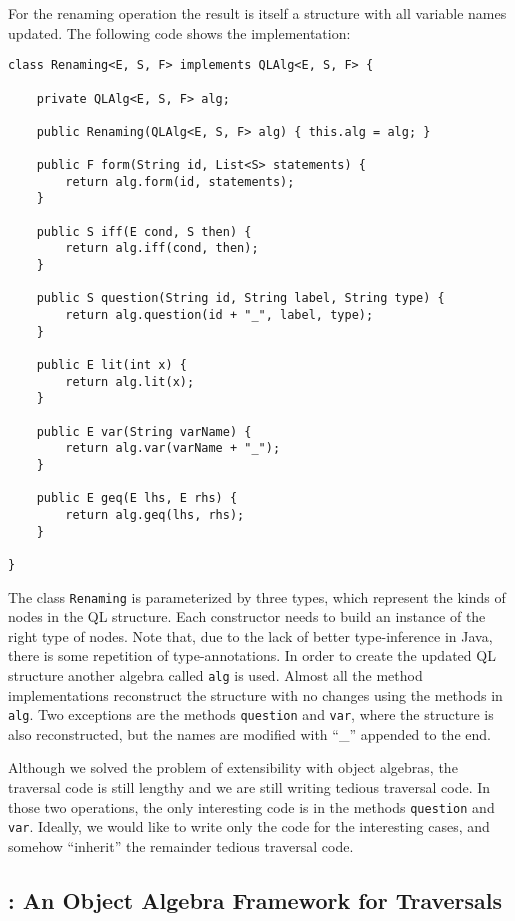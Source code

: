For the renaming operation the result is itself a structure
with all variable names updated. The following code shows the
implementation:

\begin{lstlisting}[numbers=none]
class Renaming<E, S, F> implements QLAlg<E, S, F> {

	private QLAlg<E, S, F> alg;
	
	public Renaming(QLAlg<E, S, F> alg) { this.alg = alg; }
	
	public F form(String id, List<S> statements) {
		return alg.form(id, statements);
	}

	public S iff(E cond, S then) {
		return alg.iff(cond, then);
	}

	public S question(String id, String label, String type) {
		return alg.question(id + "_", label, type);
	}

	public E lit(int x) {
		return alg.lit(x);
	}

	public E var(String varName) {
		return alg.var(varName + "_");
	}

	public E geq(E lhs, E rhs) {
		return alg.geq(lhs, rhs);
	}

}
\end{lstlisting}

The class \lstinline{Renaming} is parameterized by three types,
which represent the kinds of nodes in the QL structure. Each
constructor needs to build an instance of the right type of nodes.
Note that, due to the lack of better type-inference in Java, there is
some repetition of type-annotations. In order to create the updated
QL structure another algebra called \lstinline{alg} is used.
Almost all the method implementations reconstruct the structure with
no changes using the methods in \lstinline{alg}. Two exceptions are the
methods \lstinline{question} and \lstinline{var}, where the structure is also reconstructed, but
the names are modified with ``\_'' appended to the end.

Although we solved the problem of extensibility with object
algebras, the traversal code is still lengthy and we are still writing
tedious traversal code. In those two operations, the only interesting code
is in the methods \lstinline{question} and \lstinline{var}. Ideally, we would like to write only
the code for the interesting cases, and somehow ``inherit'' the
remainder tedious traversal code.

\subsection{\Name: An Object Algebra Framework for Traversals}

